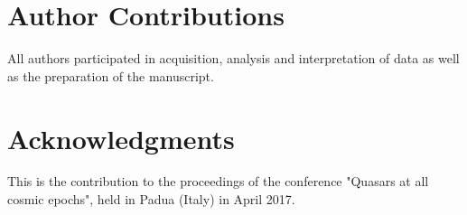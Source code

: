 \documentclass[utf8]{frontiersSCNS} %
\begin{document}
\section*{Author Contributions}
All authors participated in acquisition, analysis and interpretation of data as well as the preparation of the manuscript.



\section*{Acknowledgments}
This is the contribution to the proceedings of the conference "Quasars at all cosmic epochs", held in Padua (Italy) in April 2017.

\end{document}

